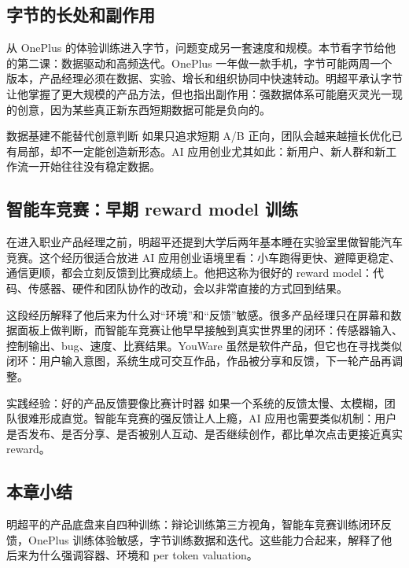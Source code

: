 \subsection{字节的长处和副作用}

从 OnePlus 的体验训练进入字节，问题变成另一套速度和规模。本节看字节给他的第二课：数据驱动和高频迭代。OnePlus 一年做一款手机，字节可能两周一个版本，产品经理必须在数据、实验、增长和组织协同中快速转动。明超平承认字节让他掌握了更大规模的产品方法，但也指出副作用：强数据体系可能磨灭灵光一现的创意，因为某些真正新东西短期数据可能是负向的。

\begin{warningbox}{数据基建不能替代创意判断}
如果只追求短期 A/B 正向，团队会越来越擅长优化已有局部，却不一定能创造新形态。AI 应用创业尤其如此：新用户、新人群和新工作流一开始往往没有稳定数据。
\end{warningbox}

\subsection{智能车竞赛：早期 reward model 训练}

在进入职业产品经理之前，明超平还提到大学后两年基本睡在实验室里做智能汽车竞赛。这个经历很适合放进 AI 应用创业语境里看：小车跑得更快、避障更稳定、通信更顺，都会立刻反馈到比赛成绩上。他把这称为很好的 reward model：代码、传感器、硬件和团队协作的改动，会以非常直接的方式回到结果。

这段经历解释了他后来为什么对“环境”和“反馈”敏感。很多产品经理只在屏幕和数据面板上做判断，而智能车竞赛让他早早接触到真实世界里的闭环：传感器输入、控制输出、bug、速度、比赛结果。YouWare 虽然是软件产品，但它也在寻找类似闭环：用户输入意图，系统生成可交互作品，作品被分享和反馈，下一轮产品再调整。

\begin{importantbox}{实践经验：好的产品反馈要像比赛计时器}
如果一个系统的反馈太慢、太模糊，团队很难形成直觉。智能车竞赛的强反馈让人上瘾，AI 应用也需要类似机制：用户是否发布、是否分享、是否被别人互动、是否继续创作，都比单次点击更接近真实 reward。
\end{importantbox}

\subsection{本章小结}

明超平的产品底盘来自四种训练：辩论训练第三方视角，智能车竞赛训练闭环反馈，OnePlus 训练体验敏感，字节训练数据和迭代。这些能力合起来，解释了他后来为什么强调容器、环境和 per token valuation。

